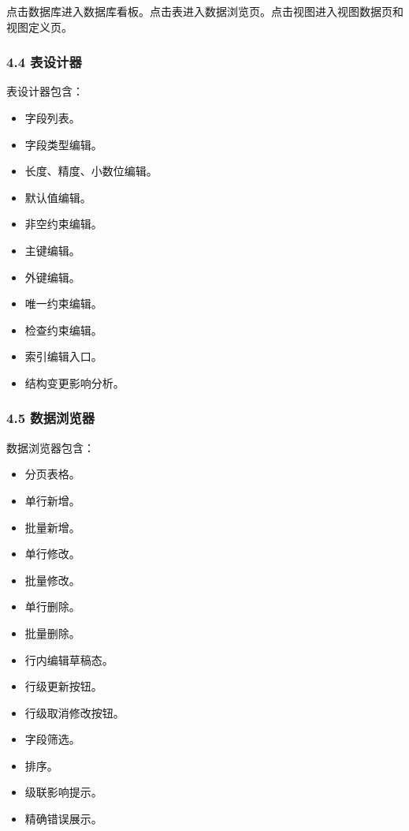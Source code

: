 \documentclass[
  a4paper,
  UTF8]{ctexart}
\providecommand{\tightlist}{%
  \setlength{\itemsep}{0pt}\setlength{\parskip}{0pt}}
\begin{document}
点击数据库进入数据库看板。点击表进入数据浏览页。点击视图进入视图数据页和视图定义页。

\hypertarget{ux8868ux8bbeux8ba1ux5668}{%
\subsubsection{4.4 表设计器}\label{ux8868ux8bbeux8ba1ux5668}}

表设计器包含：

\begin{itemize}
\tightlist
\item
  字段列表。
\item
  字段类型编辑。
\item
  长度、精度、小数位编辑。
\item
  默认值编辑。
\item
  非空约束编辑。
\item
  主键编辑。
\item
  外键编辑。
\item
  唯一约束编辑。
\item
  检查约束编辑。
\item
  索引编辑入口。
\item
  结构变更影响分析。
\end{itemize}

\hypertarget{ux6570ux636eux6d4fux89c8ux5668}{%
\subsubsection{4.5 数据浏览器}\label{ux6570ux636eux6d4fux89c8ux5668}}

数据浏览器包含：

\begin{itemize}
\tightlist
\item
  分页表格。
\item
  单行新增。
\item
  批量新增。
\item
  单行修改。
\item
  批量修改。
\item
  单行删除。
\item
  批量删除。
\item
  行内编辑草稿态。
\item
  行级更新按钮。
\item
  行级取消修改按钮。
\item
  字段筛选。
\item
  排序。
\item
  级联影响提示。
\item
  精确错误展示。
\end{itemize}
\end{document}
